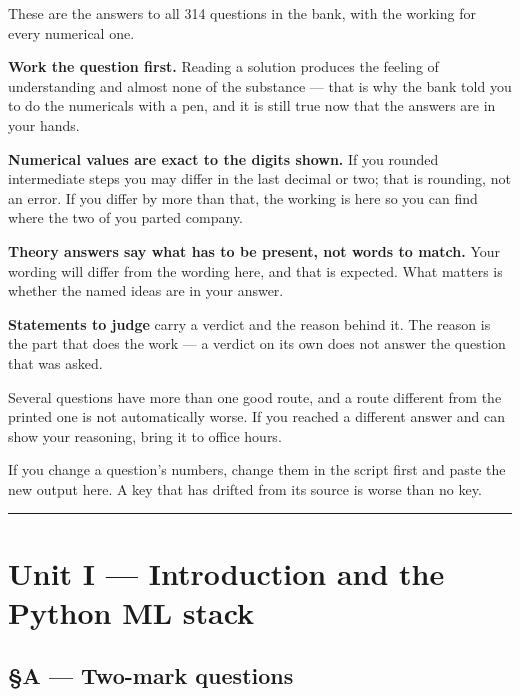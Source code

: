 \documentclass[11pt,a4paper]{article}
\begin{document}

\begin{infobox}
These are the answers to all 314 questions in the bank, with the working for
every numerical one.

\textbf{Work the question first.} Reading a solution produces the feeling of
understanding and almost none of the substance --- that is why the bank told
you to do the numericals with a pen, and it is still true now that the answers
are in your hands.

\textbf{Numerical values are exact to the digits shown.} If you rounded
intermediate steps you may differ in the last decimal or two; that is rounding,
not an error. If you differ by more than that, the working is here so you can
find where the two of you parted company.

\textbf{Theory answers say what has to be present, not words to match.} Your
wording will differ from the wording here, and that is expected. What matters
is whether the named ideas are in your answer.

\textbf{Statements to judge} carry a verdict and the reason behind it. The
reason is the part that does the work --- a verdict on its own does not answer
the question that was asked.

Several questions have more than one good route, and a route different from the
printed one is not automatically worse. If you reached a different answer and
can show your reasoning, bring it to office hours.
\end{infobox}

\noindent If you change a question's numbers, change them in the script first
and paste the new output here. A key that has drifted from its source is worse
than no key.

\vspace{0.5em}\hrule

\section*{Unit I --- Introduction and the Python ML stack}

\subsection*{§A --- Two-mark questions}
\end{document}
